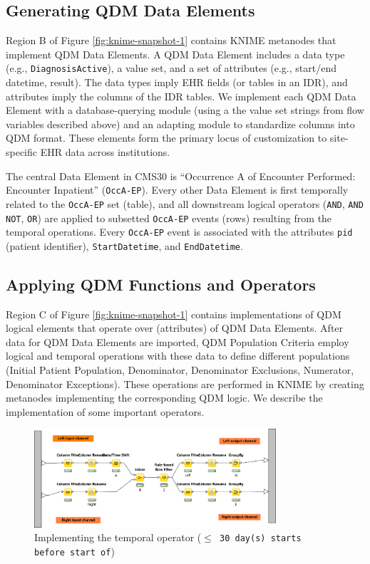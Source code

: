 \documentclass{article}
\begin{document}
\subsection{Generating QDM Data Elements}

Region B of Figure \ref{fig:knime-snapshot-1} contains KNIME metanodes that implement QDM Data Elements. A QDM Data Element includes a data type (e.g., \texttt{DiagnosisActive}), a value set, and a set of attributes (e.g., start/end datetime, result). The data types imply EHR fields (or tables in an IDR), and attributes imply the columns of the IDR tables. We implement each QDM Data Element with a database-querying module (using a the value set strings from flow variables described above) and an adapting module to standardize columns into QDM format. These elements form the primary locus of customization to site-specific EHR data across institutions.

The central Data Element in CMS30 is ``Occurrence A of Encounter Performed: Encounter Inpatient'' (\texttt{OccA-EP}). Every other Data Element is first temporally related to the \texttt{OccA-EP} set (table), and all downstream logical operators (\texttt{AND}, \texttt{AND NOT}, \texttt{OR}) are applied to subsetted \texttt{OccA-EP} events (rows) resulting from the temporal operations. Every \texttt{OccA-EP} event is associated with the attributes \texttt{pid} (patient identifier), \texttt{StartDatetime}, and \texttt{EndDatetime}. 

\subsection{Applying QDM Functions and Operators}

Region C of Figure \ref{fig:knime-snapshot-1} contains implementations of QDM logical elements that operate over (attributes) of QDM Data Elements. After data for QDM Data Elements are imported, QDM Population Criteria employ logical and temporal operations with these data to define different populations (Initial Patient Population, Denominator, Denominator Exclusions, Numerator, Denominator Exceptions). These operations are performed in KNIME by creating metanodes implementing the corresponding QDM logic. We describe the implementation of some important operators.

\begin{figure}
\centering
	\includegraphics[width=0.8\textwidth]{figures/knime-snapshot-2.png}
	\caption{Implementing the temporal operator (\texttt{$\leq$ 30 day(s) starts before start of})}\label{fig:knime-snapshot-2}
\end{figure}
\vspace{5pt}
\end{document}
